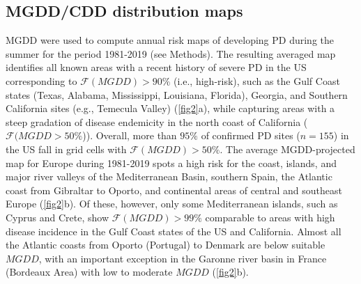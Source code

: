 \subsection{MGDD/CDD distribution maps}

MGDD were used to compute annual risk maps of developing PD during the summer
for the period 1981-2019 (see Methods). The resulting averaged map identifies
all known areas with a recent history of severe PD in the US corresponding to
$\mathcal{F}(MGDD) > 90\%$ (i.e., high-risk), such as the Gulf Coast states
(Texas, Alabama, Mississippi, Louisiana, Florida), Georgia, and Southern
California sites (e.g., Temecula Valley) (\cref{fig2}a), while capturing areas
with a steep gradation of disease endemicity in the north coast of California
($\mathcal{F}(MGDD>50\%$)).	Overall, more than $95\%$ of confirmed PD sites
    ($n = 155$) in the US fall in grid cells with $\mathcal{F}(MGDD) > 50 \%$.
    The average MGDD-projected map for Europe during 1981-2019 spots a high
    risk for the coast, islands, and major river valleys of the Mediterranean
    Basin, southern Spain, the Atlantic coast from Gibraltar to Oporto, and
    continental areas of central and southeast Europe (\cref{fig2}b). Of these,
    however, only some Mediterranean islands, such as Cyprus and Crete, show
$\mathcal{F}(MGDD) > 99\%$ comparable to areas with high disease incidence in
    the Gulf Coast states of the US and California. Almost all the Atlantic
    coasts from Oporto (Portugal) to Denmark are below suitable $MGDD$, with an
    important exception in the Garonne river basin in France (Bordeaux Area)
    with low to moderate $MGDD$ (\cref{fig2}b).

